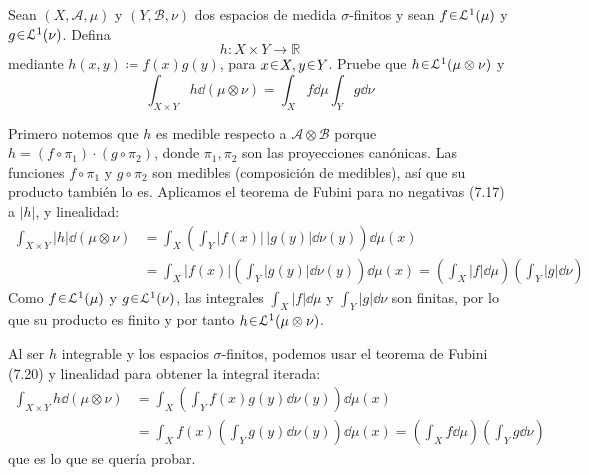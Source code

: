 \setcounter{neje}{50}
\begin{nejer}
Sean $(X, \mathcal{A}, \mu)$ y $(Y, \mathcal{B}, \nu)$ dos espacios de medida $\sigma$-finitos y sean $f \en \mathcal{L}^1(\mu)$ y $g \en \mathcal{L}^1(\nu)$. Defina
$$
h \colon X \times Y \to \mathbb{R}
$$
mediante $h(x, y) \coloneq f(x)g(y)$, para $x \en X,y \en Y$. Pruebe que $h \en \mathcal{L}^1(\mu \otimes \nu)$ y
$$
\int_{X \times Y} h \dd{(\mu \otimes \nu)} = \int_X f \dd{\mu} \int_Y g \dd{\nu}
$$
\end{nejer}
\begin{sol}
Primero notemos que $h$ es medible respecto a $\mathcal{A} \otimes \mathcal{B}$ porque $h = (f \circ \pi_1) \cdot (g \circ \pi_2)$, donde $\pi_1, \pi_2$ son las proyecciones canónicas. Las funciones $f \circ \pi_1$ y $g \circ \pi_2$ son medibles (composición de medibles), así que su producto también lo es.
Aplicamos el teorema de Fubini para no negativas (7.17) a $|h|$, y linealidad:
\begin{align*}
\int_{X \times Y} |h| \dd{(\mu \otimes \nu)}
&= \int_X \left( \int_Y |f(x)|\,|g(y)| \dd{\nu(y)} \right) \dd{\mu(x)}\\
&= \int_X |f(x)| \left( \int_Y |g(y)| \dd{\nu(y)} \right) \dd{\mu(x)}
= \left( \int_X |f| \dd{\mu} \right) \left( \int_Y |g| \dd{\nu} \right)
\end{align*}
Como $f \en \mathcal{L}^1(\mu)$ y $g \en \mathcal{L}^1(\nu)$, las integrales $\int_X |f| \dd{\mu}$ y $\int_Y |g| \dd{\nu}$ son finitas, por lo que su producto es finito y por tanto $h \en \mathcal{L}^1(\mu \otimes \nu)$.

Al ser $h$ integrable y los espacios $\sigma$-finitos, podemos usar el teorema de Fubini (7.20) y linealidad para obtener la integral iterada:
\begin{align*}
\int_{X \times Y} h \dd{(\mu \otimes \nu)}
&= \int_X \left( \int_Y f(x) g(y) \dd{\nu(y)} \right) \dd{\mu(x)}\\
&= \int_X f(x) \left( \int_Y g(y) \dd{\nu(y)} \right) \dd{\mu(x)}
= \left( \int_X f \dd{\mu} \right) \left( \int_Y g \dd{\nu} \right)
\end{align*}
que es lo que se quería probar.
\end{sol}